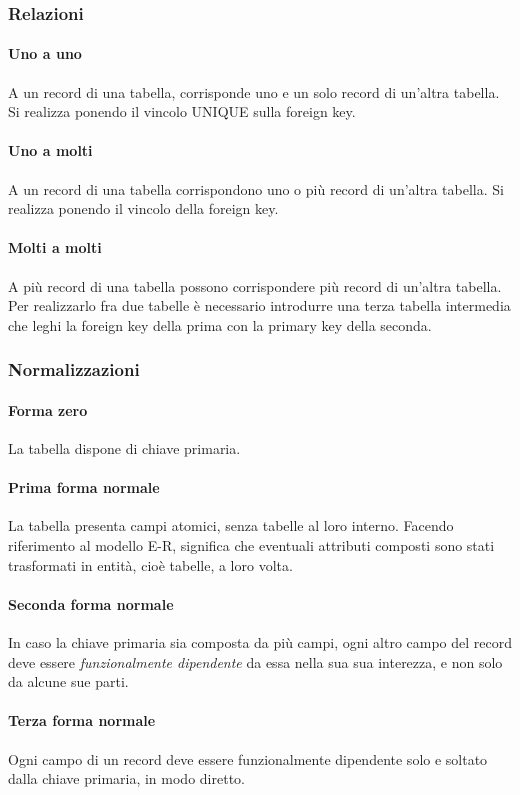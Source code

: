 \documentclass{article}
\begin{document}
        \subsubsection{Relazioni}
            \paragraph{Uno a uno} A un record di una tabella, corrisponde uno e un solo record di un'altra tabella. Si realizza ponendo il vincolo UNIQUE sulla foreign key.
            \paragraph{Uno a molti} A un record di una tabella corrispondono uno o più record di un'altra tabella. Si realizza ponendo il vincolo della foreign key.
            \paragraph{Molti a molti} A più record di una tabella possono corrispondere più record di un'altra tabella. Per realizzarlo fra due tabelle è necessario introdurre una terza tabella intermedia che leghi la foreign key della prima con la primary key della seconda.
        \subsubsection{Normalizzazioni}
            \paragraph{Forma zero} La tabella dispone di chiave primaria.
            \paragraph{Prima forma normale} La tabella presenta campi atomici, senza tabelle al loro interno. Facendo riferimento al modello E-R, significa che eventuali attributi composti sono stati trasformati in entità, cioè tabelle, a loro volta.
            \paragraph{Seconda forma normale} In caso la chiave primaria sia composta da più campi, ogni altro campo del record deve essere \textit{funzionalmente dipendente} da essa nella sua sua interezza, e non solo da alcune sue parti.
            \paragraph{Terza forma normale} Ogni campo di un record deve essere funzionalmente dipendente solo e soltato dalla chiave primaria, in modo diretto.
\end{document}
